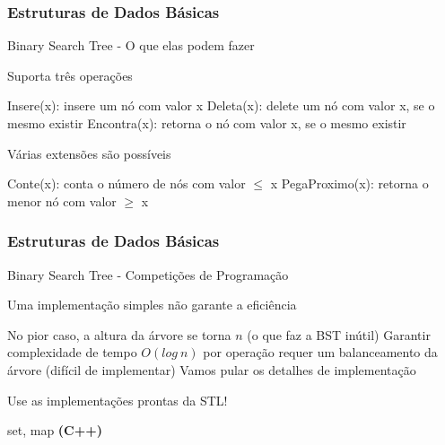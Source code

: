 \begin{frame}
\frametitle{Estruturas de Dados Básicas}
\begin{block}{Binary Search Tree - O que elas podem fazer}
	\begin{itemize}
		\bitem Suporta três operações
		\begin{itemize}
			\bitem Insere(x): insere um nó com valor x
			\bitem Deleta(x): delete um nó com valor x, se o mesmo existir
			\bitem Encontra(x): retorna o nó com valor x, se o mesmo existir
		\end{itemize}
		\bitem Várias extensões são possíveis
		\begin{itemize}
			\bitem Conte(x): conta o número de nós com valor $\leq$ x
			\bitem PegaProximo(x): retorna o menor nó com valor $\geq$ x
		\end{itemize}
	\end{itemize}
\end{block}
\end{frame}

\begin{frame}
\frametitle{Estruturas de Dados Básicas}
\begin{block}{Binary Search Tree - Competições de Programação}
	\begin{itemize}
		\bitem Uma implementação simples não garante a eficiência
		\begin{itemize}
			\bitem No pior caso, a altura da árvore se torna $n$ (o que faz a BST inútil)
			\bitem Garantir complexidade de tempo $O(log\ n)$ por operação requer um balanceamento da árvore (difícil de implementar)
			\bitem Vamos pular os detalhes de implementação
		\end{itemize}
		\bitem Use as implementações prontas da STL!
		\begin{itemize}
			\bitem set, map \textbf{(C++)}
		\end{itemize}
	\end{itemize}
\end{block}
\end{frame}

